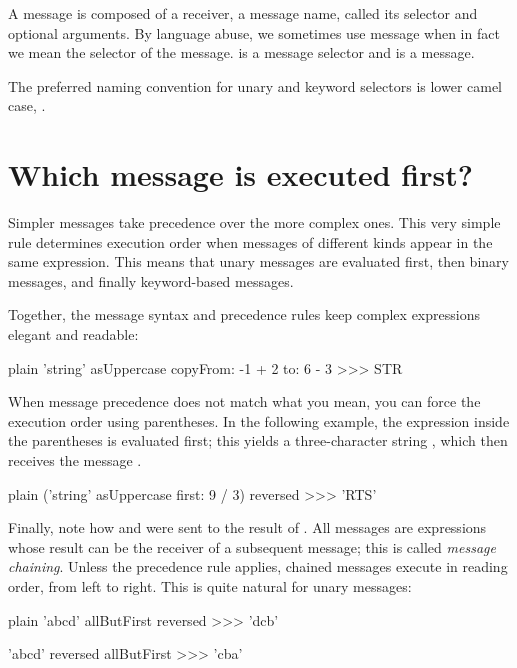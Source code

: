 \documentclass[10pt,twoside,english]{_support/latex/sbabook/sbabook}
\begin{document}
\begin{coffee}
A message is composed of a receiver, a message name, called its selector and optional arguments. By language abuse, we sometimes use message when in fact we mean the selector of the message. \textcode{,} is a message selector and  is a message. 
\end{coffee}

\begin{coffee}
The preferred naming convention for unary and keyword selectors is lower camel case, .
\end{coffee}
\section{Which message is executed first?}
Simpler messages take precedence over the more complex ones.
This very simple rule determines execution order when messages of different kinds appear in the same expression.
This means that unary messages are evaluated first, then binary messages, and finally keyword-based messages.

Together, the message syntax and precedence rules keep complex expressions elegant and readable:

\begin{displaycode}{plain}
'string' asUppercase copyFrom: -1 + 2 to: 6 - 3
>>> STR
\end{displaycode}

When message precedence does not match what you mean, you can force the execution order using parentheses.
In the following example, the expression inside the parentheses is evaluated first; this yields a three-character string , which then receives the message .

\begin{displaycode}{plain}
('string' asUppercase first: 9 / 3) reversed
>>> 'RTS'
\end{displaycode}

Finally, note how  and  were sent to the result of .
All messages are expressions whose result can be the receiver of a subsequent message; this is called \textit{message chaining}.
Unless the precedence rule applies, chained messages execute in reading order, from left to right.
This is quite natural for unary messages:

\begin{displaycode}{plain}
'abcd' allButFirst reversed
>>> 'dcb'

'abcd' reversed allButFirst
>>> 'cba'
\end{displaycode}
\end{document}

